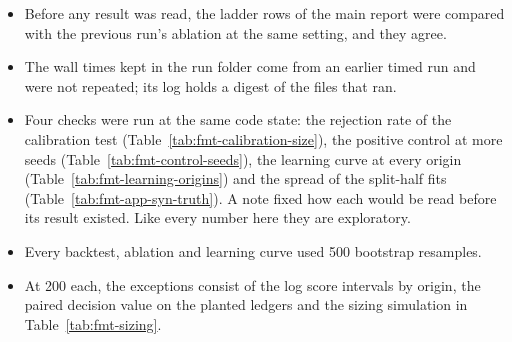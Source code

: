 \begin{itemize}
\item Before any result was read, the ladder rows of the main report were compared with the previous run's ablation at the same setting, and they agree.
\item The wall times kept in the run folder come from an earlier timed run and were not repeated; its log holds a digest of the files that ran.
\item Four checks were run at the same code state: the rejection rate of the calibration test (Table~\ref{tab:fmt-calibration-size}), the positive control at more seeds (Table~\ref{tab:fmt-control-seeds}), the learning curve at every origin (Table~\ref{tab:fmt-learning-origins}) and the spread of the split-half fits (Table~\ref{tab:fmt-app-syn-truth}). A note fixed how each would be read before its result existed. Like every number here they are exploratory.
\item Every backtest, ablation and learning curve used 500 bootstrap resamples.
\item At 200 each, the exceptions consist of the log score intervals by origin, the paired decision value on the planted ledgers and the sizing simulation in Table~\ref{tab:fmt-sizing}.

\end{itemize}
